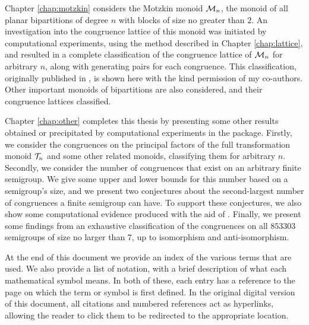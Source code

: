 Chapter \ref{chap:motzkin} considers the Motzkin monoid $\mathcal{M}_n$, the monoid of
all planar bipartitions of degree $n$ with blocks of size no greater than $2$.
An investigation into the congruence lattice of this monoid was initiated by
computational experiments, using the method described in Chapter
\ref{chap:lattice}, and resulted in a complete classification of the congruence
lattice of $\mathcal{M}_n$ for arbitrary $n$, along with generating pairs for each
congruence.  This classification, originally published in \cite{ourpaper}, is
shown here with the kind permission of my co-authors.  Other important monoids
of bipartitions are also considered, and their congruence lattices classified.

Chapter \ref{chap:other} completes this thesis by presenting some other results
obtained or precipitated by computational experiments in the \Semigroups{}
package.  Firstly, we consider the congruences on the principal factors of the
full transformation monoid $\mathcal{T}_n$ and some other related monoids, classifying
them for arbitrary $n$.  Secondly, we consider the number of congruences that
exist on an arbitrary finite semigroup.  We give some upper and lower bounds for
this number based on a semigroup's size, and we present two conjectures about
the second-largest number of congruences a finite semigroup can have.  To
support these conjectures, we also show some computational evidence produced
with the aid of \smallsemi{} \cite{smallsemi}.  Finally, we present some
findings from an exhaustive classification of the congruences on all $853303$
semigroups of size no larger than $7$, up to isomorphism and anti-isomorphism.

At the end of this document we provide an index of the various terms that are
used.  We also provide a list of notation, with a brief description of what each
mathematical symbol means.  In both of these, each entry has a reference to the
page on which the term or symbol is first defined.  In the original digital
version of this document, all citations and numbered references act as
hyperlinks, allowing the reader to click them to be redirected to the
appropriate location.
